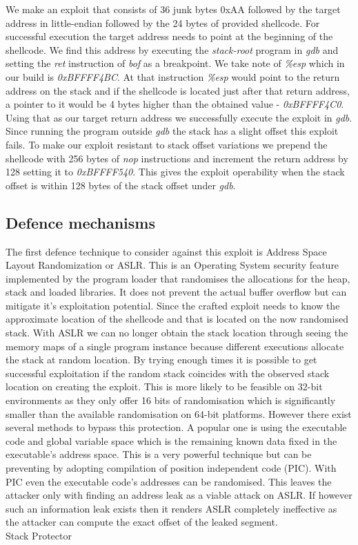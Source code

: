 We make an exploit that consists of 36 junk bytes 0xAA followed by the target address in little-endian followed by the 24 bytes of provided shellcode. For successful execution the target address needs to point at the beginning of the shellcode. We find this address by executing the \emph{stack-root} program in \emph{gdb} and setting the \emph{ret} instruction of \emph{bof} as a breakpoint. We take note of \emph{\%esp} which in our build is \emph{0xBFFFF4BC}. At that instruction \emph{\%esp} would point to the return address on the stack and if the shellcode is located just after that return address, a pointer to it would be 4 bytes higher than the obtained value - \emph{0xBFFFF4C0}. Using that as our target return address we successfully execute the exploit in \emph{gdb}. Since running the program outside \emph{gdb} the stack has a slight offset this exploit fails. To make our exploit resistant to stack offset variations we prepend the shellcode with 256 bytes of \emph{nop} instructions and increment the return address by 128 setting it to \emph{0xBFFFF540}. This gives the exploit operability when the stack offset is within 128 bytes of the stack offset under \emph{gdb}.

\subsection{Defence mechanisms}
The first defence technique to consider against this exploit is Address Space Layout Randomization or ASLR. This is an Operating System security feature implemented by the program loader that randomises the allocations for the heap, stack and loaded libraries. It does not prevent the actual buffer overflow but can mitigate it's exploitation potential. Since the crafted exploit needs to know the approximate location of the shellcode and that is located on the now randomised stack. With ASLR we can no longer obtain the stack location through seeing the memory maps of a single program instance because different executions allocate the stack at random location. By trying enough times it is possible to get successful exploitation if the random stack coincides with the observed stack location on creating the exploit. This is more likely to be feasible on 32-bit environments as they only offer 16 bits of randomisation which is significantly smaller than the available randomisation on 64-bit platforms. However there exist several methods to bypass this protection. A popular one is using the executable code and global variable space  which is the remaining known data fixed in the executable's address space. This is a very powerful technique but can be preventing by adopting compilation of position independent code (PIC). With PIC even the executable code's addresses can be randomised. This leaves the attacker only with finding an address leak as a viable attack on ASLR. If however such an information leak exists then it renders ASLR completely ineffective as the attacker can compute the exact offset of the leaked segment.\\
\tab Stack Protector \cite{Stackgua58} \\